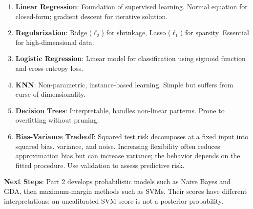 \documentclass[11pt,twoside]{article}
\numberwithin{equation}{section}
\theoremstyle{plain}
\theoremstyle{definition}
\theoremstyle{remark}
\begin{document}
\begin{tcolorbox}[colback=yellow!10!white,colframe=orange!75!black,title=Key Takeaways]
\begin{enumerate}
\item \textbf{Linear Regression}: Foundation of supervised learning. Normal equation for closed-form; gradient descent for iterative solution.

\item \textbf{Regularization}: Ridge ($\ell_2$) for shrinkage, Lasso ($\ell_1$) for sparsity. Essential for high-dimensional data.

\item \textbf{Logistic Regression}: Linear model for classification using sigmoid function and cross-entropy loss.

\item \textbf{KNN}: Non-parametric, instance-based learning. Simple but suffers from curse of dimensionality.

\item \textbf{Decision Trees}: Interpretable, handles non-linear patterns. Prone to overfitting without pruning.

\item \textbf{Bias-Variance Tradeoff}: Squared test risk decomposes at a fixed input into squared bias, variance, and noise. Increasing flexibility often reduces approximation bias but can increase variance; the behavior depends on the fitted procedure. Use validation to assess predictive risk.
\end{enumerate}

\textbf{Next Steps}: Part 2 develops probabilistic models such as Naive Bayes and GDA, then maximum-margin methods such as SVMs. Their scores have different interpretations: an uncalibrated SVM score is not a posterior probability.
\end{tcolorbox}
\end{document}
